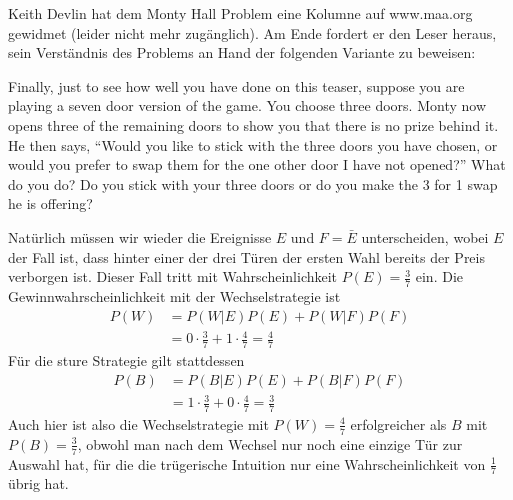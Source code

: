 Keith Devlin hat dem Monty Hall Problem eine Kolumne auf www.maa.org
gewidmet (leider nicht mehr zugänglich). Am Ende
fordert er den Leser heraus, sein Verständnis des Problems an
Hand der folgenden Variante zu beweisen:
\medskip

Finally, just to see how well you have done on this teaser, suppose
you are playing a seven door version of the game. You choose three
doors. Monty now opens three of the remaining doors to show you
that there is no prize behind it. He then says, ``Would you like to
stick with the three doors you have chosen, or would you prefer to
swap them for the one other door I have not opened?'' What do you
do? Do you stick with your three doors or do you make the 3 for 1
swap he is offering?


\begin{loesung}
Natürlich müssen wir wieder die Ereignisse $E$ und $F=\bar E$ unterscheiden,
wobei $E$ der Fall ist, dass hinter einer der drei Türen der ersten Wahl
bereits der Preis verborgen ist.  Dieser Fall tritt mit Wahrscheinlichkeit
$P(E)=\frac37$ ein.
Die Gewinnwahrscheinlichkeit mit der Wechselstrategie ist
\begin{align*}
P(W)&=P(W|E)P(E)+P(W|F)P(F)\\
&=0\cdot \frac37+1\cdot\frac47=\frac47
\end{align*}
Für die sture Strategie gilt stattdessen
\begin{align*}
P(B)&=P(B|E)P(E)+P(B|F)P(F)\\
&=1\cdot \frac37+0\cdot\frac47=\frac37
\end{align*}
Auch hier ist also die Wechselstrategie mit $P(W)=\frac47$
erfolgreicher als $B$ mit $P(B)=\frac37$, obwohl man
nach dem Wechsel nur noch eine einzige Tür zur Auswahl hat, für
die die trügerische Intuition nur eine Wahrscheinlichkeit von
$\frac17$ übrig hat.
\end{loesung}

